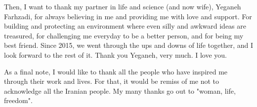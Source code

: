 Then, I want to thank my partner in life and science (and now wife), Yeganeh Farhzadi, for always believing in me and providing me with love and support. For building and protecting an environment where even silly and awkward ideas are treasured, for challenging me everyday to be a better person, and for being my best friend. Since 2015, we went through the ups and downs of life together, and I look forward to the rest of it. Thank you Yeganeh, very much. I love you.

As a final note, I would like to thank all the people who have inspired me through their work and lives. For that, it would be remiss of me not to acknowledge all the Iranian people. My many thanks go out to "woman, life, freedom".


